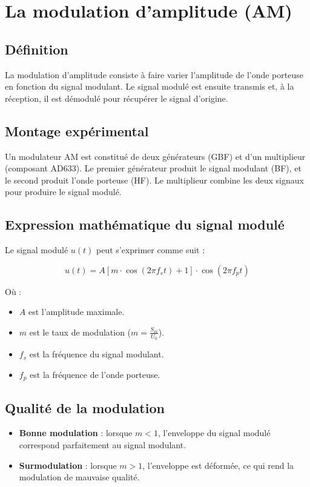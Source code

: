 \documentclass[12pt]{article}
\begin{document}
\section{La modulation d’amplitude (AM)}

\subsection{Définition}

La modulation d’amplitude consiste à faire varier l’amplitude de l’onde porteuse en fonction du signal modulant. Le signal modulé est ensuite transmis et, à la réception, il est démodulé pour récupérer le signal d’origine.

\subsection{Montage expérimental}

Un modulateur AM est constitué de deux générateurs (GBF) et d’un multiplieur (composant AD633). Le premier générateur produit le signal modulant (BF), et le second produit l’onde porteuse (HF). Le multiplieur combine les deux signaux pour produire le signal modulé.

\subsection{Expression mathématique du signal modulé}

Le signal modulé \( u(t) \) peut s’exprimer comme suit :

\[
u(t) = A \left[ m \cdot \cos(2\pi f_s t) + 1 \right] \cdot \cos(2\pi f_p t)
\]

Où :
\begin{itemize}
    \item \( A \) est l’amplitude maximale.
    \item \( m \) est le taux de modulation (\( m = \frac{S_m}{U_0} \)).
    \item \( f_s \) est la fréquence du signal modulant.
    \item \( f_p \) est la fréquence de l’onde porteuse.
\end{itemize}

\subsection{Qualité de la modulation}

\begin{itemize}
    \item \textbf{Bonne modulation} : lorsque \( m < 1 \), l’enveloppe du signal modulé correspond parfaitement au signal modulant.
    \item \textbf{Surmodulation} : lorsque \( m > 1 \), l’enveloppe est déformée, ce qui rend la modulation de mauvaise qualité.
\end{itemize}
\end{document}
